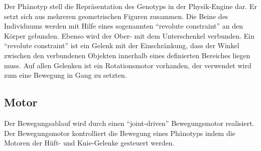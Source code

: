       Der Phänotyp stell die Repräsentation des Genotyps in der Physik-Engine dar.
      Er setzt sich aus mehreren geometrischen Figuren zusammen.
      Die Beine des Individuums werden mit Hilfe eines sogenannten ``revolute constraint'' an den Körper gebunden.
      Ebenso wird der Ober- mit dem Unterschenkel verbunden.
      Ein ``revolute constraint'' ist ein Gelenk mit der Einschränkung,
      dass der Winkel zwischen den verbundenen Objekten innerhalb eines definierten Bereiches liegen muss.
      Auf allen Gelenken ist ein Rotationsmotor vorhanden, der verwendet wird zum eine Bewegung in Gang zu setzten.

    \subsection{Motor\label{sub:Engine}}

      Der Bewegungsablauf wird durch einen ``joint-driven'' Bewegungsmotor realisiert.
      Der Bewegungsmotor kontrolliert die Bewegung eines Phänotyps indem die Motoren der Hüft- und
      Knie-Gelenke gesteuert werden.

